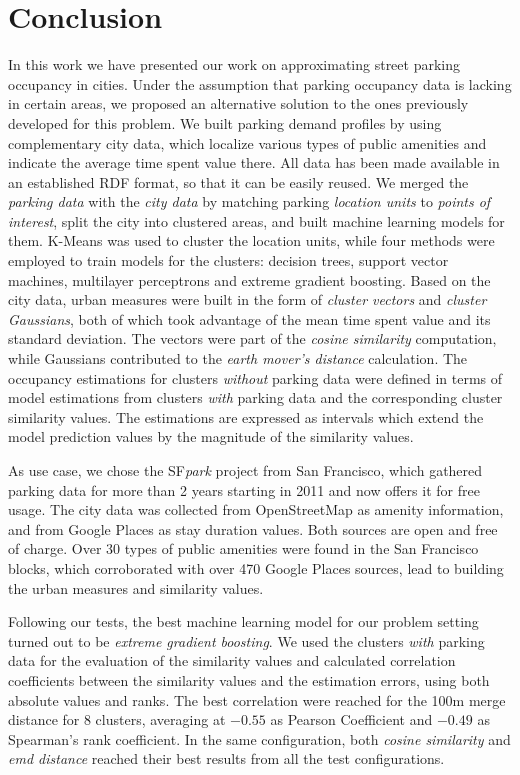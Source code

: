 	\section{Conclusion}
	In this work we have presented our work on approximating street parking occupancy in cities.
	Under the assumption that parking occupancy data is lacking in certain areas, we proposed an alternative solution to the ones previously developed for this problem.
	We built parking demand profiles by using complementary city data, which localize various types of public amenities and indicate the average time spent value there.
	All data has been made available in an established RDF format, so that it can be easily reused.
	We merged the \textit{parking data} with the \textit{city data} by matching parking \textit{location units} to \textit{points of interest}, split the city into clustered areas, and built machine learning models for them.
	K-Means was used to cluster the location units, while four methods were employed to train models for the clusters: decision trees, support vector machines, multilayer perceptrons and extreme gradient boosting.
	Based on the city data, urban measures were built in the form of \textit{cluster vectors} and \textit{cluster Gaussians}, both of which took advantage of the mean time spent value and its standard deviation.
	The vectors were part of the \textit{cosine similarity} computation, while Gaussians contributed to the \textit{earth mover's distance} calculation.
	The occupancy estimations for clusters \textit{without} parking data were defined in terms of model estimations from clusters \textit{with} parking data and the corresponding cluster similarity values.
	The estimations are expressed as intervals which extend the model prediction values by the magnitude of the similarity values. 
	
	As use case, we chose the SF\textit{park} project from San Francisco, which gathered parking data for more than 2 years starting in 2011 and now offers it for free usage.
	The city data was collected from OpenStreetMap as amenity information, and from Google Places as stay duration values.
	Both sources are open and free of charge.
	Over 30 types of public amenities were found in the San Francisco blocks, which corroborated with over 470 Google Places sources, lead to building the urban measures and similarity values. 
	
	Following our tests, the best machine learning model for our problem setting turned out to be \textit{extreme gradient boosting}.
	We used the clusters \textit{with} parking data for the evaluation of the similarity values and calculated correlation coefficients between the similarity values and the estimation errors, using both absolute values and ranks.
	The best correlation were reached for the 100m merge distance for 8 clusters, averaging at $-0.55$ as Pearson Coefficient and $-0.49$ as Spearman's rank coefficient.
	In the same configuration, both \textit{cosine similarity} and \textit{emd distance} reached their best results from all the test configurations.
	
